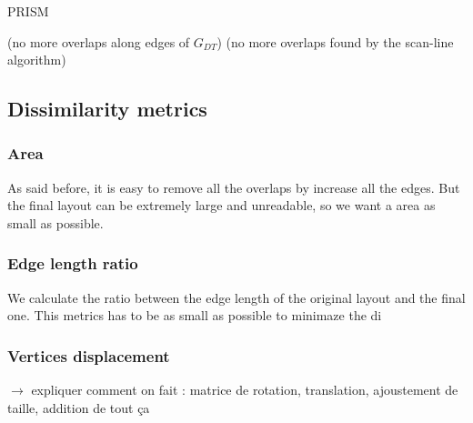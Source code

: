\documentclass[12pt]{report}
\begin{document}
\bigskip
\begin{algorithm}[H]
\caption{PRISM}
	 
(no more overlaps along edges of $G_{DT}$)
\BlankLine
{}	
(no more overlaps found by the scan-line algorithm)
\end{algorithm}

\subsection{Dissimilarity metrics}

\subsubsection{Area}
As said before, it is easy to remove all the overlaps by increase all the edges. But the final layout can be extremely large and unreadable, so we want a area as small as possible.

\subsubsection{Edge length ratio}
We calculate the ratio between the edge length of the original layout and the final one. 
This metrics has to be as small as possible to minimaze the di
\subsubsection{Vertices displacement}


$\rightarrow$ expliquer comment on fait : matrice de rotation, translation, ajoustement de taille, addition de tout ça
\end{document}
